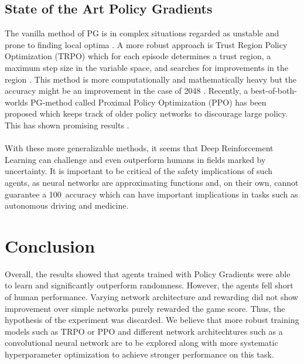 \documentclass[11pt, fleqn]{article}
\begin{document}
\subsection*{State of the Art Policy Gradients} The vanilla method of PG is in complex situations regarded as unstable and prone to finding local optima \cite[Conclusions]{Kar} \cite{Hui}. A more robust approach is Trust Region Policy Optimization (TRPO) which for each episode determines a trust region, a maximum step size in the variable space, and searches for improvements in the region \cite{TRPO}. This method is more computationally and mathematically heavy but the accuracy might be an improvement in the case of 2048 \cite["Line search"]{Hui}. Recently, a best-of-both-worlds PG-method called Proximal Policy Optimization (PPO) has been proposed which keeps track of older policy networks to discourage large policy. This has shown promising results \cite{PPO}.
\\\\
With these more generalizable methods, it seems that Deep Reinforcement Learning can challenge and even outperform humans in fields marked by uncertainty. It is important to be critical of the safety implications of such agents, as neural networks are approximating functions and, on their own, cannot guarantee a 100\pro\ accuracy which can have important implications in tasks such as autonomous driving and medicine.
\section{Conclusion}
Overall, the results showed that agents trained with Policy Gradients were able to learn and significantly outperform randomness. However, the agents fell short of human performance. Varying network architecture and rewarding did not show improvement over simple networks purely rewarded the game score. Thus, the hypothesis of the experiment was discarded. We believe that more robust training models such as TRPO or PPO and  different network architechtures such as a convolutional neural network are to be explored along with more systematic hyperparameter optimization to achieve stronger performance on this task.
 
\end{document}
